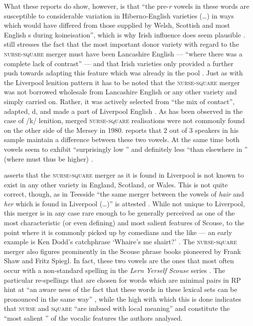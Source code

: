 What these reports do show, however, is that ``the pre-\emph{r} vowels in these words are susceptible to considerable variation in Hiberno-English varieties (\ldots) in ways which would have differed from those supplied by Welsh, Scottish and most English s during koineisation'', which is why Irish influence does seem plausible \citep[128]{honeybone2007}.
\parencite{honeybone2007} still stresses the fact that the most important donor variety with regard to the \textsc{nurse}-\textsc{square} merger must have been Lancashire English --- ``where there was a complete lack of contrast'' --- and that Irish varieties only provided a further push towards adapting this feature which was already in the pool \citep[129]{honeybone2007}.
Just as with the Liverpool lenition pattern it has to be noted that the \textsc{nurse}-\textsc{square} merger was not borrowed wholesale from Lancashire English or any other variety and simply carried on. 
Rather, it was actively selected from ``the mix of  contact'', adapted, d, and made a part of Liverpool English \parencite[cf.][129]{honeybone2007}.
As has been observed in the case of /k/ lenition, merged \textsc{nurse}-\textsc{square} realisations were not commonly found on the other side of the Mersey in 1980.
\textcite[95]{newbrook1999} reports that 2 out of 3 speakers in his sample maintain a difference between these two vowels.
At the same time both vowels seem to exhibit ``surprisingly low '' and definitely less ``than elsewhere in '' (where  must thus be higher) \parencite[95]{newbrook1999}.

\citet[cf.][128]{honeybone2007} asserts that the \textsc{nurse}-\textsc{square} merger as it is found in Liverpool is not known to exist in any other variety in England, Scotland, or Wales.
This is not quite correct, though, as in Teesside ``the same merger between the vowels of \emph{hair} and \emph{her} which is found in Liverpool (\dots)'' is attested \parencite[70]{trudgill1999}.
While not unique to Liverpool, this merger is in any case rare enough to be generally perceived as one of the most characteristic (or even defining) and most salient  features of Scouse, to the point where it is commonly picked up by comedians and the like --- an early example is Ken Dodd's catchphrase `Whaire's me shairt?' \citep[cf.][73]{trudgill1999}.
The \textsc{nurse}-\textsc{square} merger also figures prominently in the Scouse phrase books pioneered by Frank Shaw and Fritz Spiegl.
In fact, these two vowels are the ones that most often occur with a non-standard spelling in the \emph{Lern Yerself Scouse} series \parencite[cf.][322]{honeybonewatson2013}.
The particular re-spellings that are chosen for words which are minimal pairs in RP hint at ``an aware ness of the fact that these words in these lexical sets can be pronounced in the same way'' \parencite[324]{honeybonewatson2013}, while the high  with which this is done indicates that \textsc{nurse} and \textsc{square} ``are imbued with local meaning'' and constitute the ``most salient '' of the vocalic features the authors analysed.

